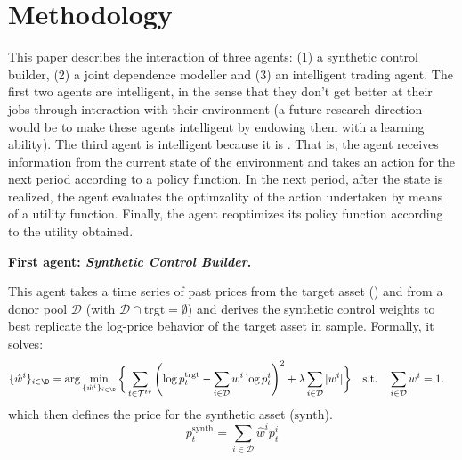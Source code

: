\section{Methodology}

This paper describes the interaction of three agents: (1) a synthetic control builder, (2) a joint dependence modeller and (3) an intelligent trading agent. 
The first two agents are  intelligent, in the sense that they don't get better at their jobs through interaction with their environment (a future research direction would be to make these agents intelligent by endowing them with a learning ability). The third agent is intelligent because it is . That is, the agent receives information from the current state of the environment and takes an action for the next period according to a policy function. In the next period, after the state is realized, the agent evaluates the optimzality of the action undertaken by means of a utility function. Finally, the agent reoptimizes its policy function according to the utility obtained.

\textbf{First agent: \textit{Synthetic Control Builder}.}

This agent takes a time series of past prices from the target asset () and from a donor pool $\mathcal D$ (with $\mathcal D \cap \text{trgt}=\emptyset$) and derives the synthetic control weights to best replicate the log-price behavior of the target asset in sample. Formally, it solves:
\begin{align*}
\{ \hat w^{i} \}_{i\in \D}
 &= \arg \min_
{\{ \hat w^i \}_{i\in\D}}
\bigg{\{}
\sum_{t\in \mathcal T^{tr}}
\left(
\log p_{t}^\text{trgt}
- 
\sum_{i\in \mathcal D}
w^i \log p_{t}^i
\right)^2
+ 
\lambda \sum_{i\in\mathcal D} |w^i|
\bigg{\}}
\quad 
\text{s.t.}
\quad 
\sum_{i\in\mathcal D} w^i=1
.
\end{align*}
which then defines the price for the synthetic asset ($\text{synth}$). 
$$
p^{\text{synth}}_t =  
\sum_{i\in \mathcal D}
\hat w^i p_{t}^i
$$

